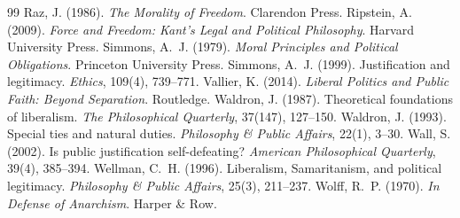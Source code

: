 \documentclass{situationist-preprint}
\begin{document}
\begin{thebibliography}{99}
 Raz, J. (1986). \emph{The Morality of Freedom}. Clarendon Press.
 Ripstein, A. (2009). \emph{Force and Freedom: Kant's Legal and Political Philosophy}. Harvard University Press.
 Simmons, A.~J. (1979). \emph{Moral Principles and Political Obligations}. Princeton University Press.
 Simmons, A.~J. (1999). Justification and legitimacy. \emph{Ethics}, 109(4), 739--771.
 Vallier, K. (2014). \emph{Liberal Politics and Public Faith: Beyond Separation}. Routledge.
 Waldron, J. (1987). Theoretical foundations of liberalism. \emph{The Philosophical Quarterly}, 37(147), 127--150.
 Waldron, J. (1993). Special ties and natural duties. \emph{Philosophy \& Public Affairs}, 22(1), 3--30.
 Wall, S. (2002). Is public justification self-defeating? \emph{American Philosophical Quarterly}, 39(4), 385--394.
 Wellman, C.~H. (1996). Liberalism, Samaritanism, and political legitimacy. \emph{Philosophy \& Public Affairs}, 25(3), 211--237.
 Wolff, R.~P. (1970). \emph{In Defense of Anarchism}. Harper \& Row.
\end{thebibliography}
\end{document}

